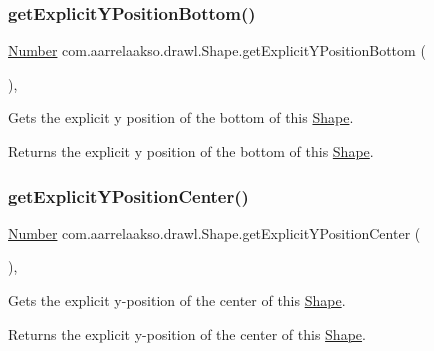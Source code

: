 \subsubsection{\texorpdfstring{get\+Explicit\+Y\+Position\+Bottom()}{getExplicitYPositionBottom()}}
{\footnotesize\ttfamily \hyperlink{interfacecom_1_1aarrelaakso_1_1drawl_1_1_number}{Number} com.\+aarrelaakso.\+drawl.\+Shape.\+get\+Explicit\+Y\+Position\+Bottom (\begin{DoxyParamCaption}{ }\end{DoxyParamCaption})\hspace{0.3cm}{\ttfamily [protected]}, {\ttfamily [inherited]}}



Gets the explicit y position of the bottom of this \hyperlink{classcom_1_1aarrelaakso_1_1drawl_1_1_shape}{Shape}. 

\begin{DoxyReturn}{Returns}
the explicit y position of the bottom of this \hyperlink{classcom_1_1aarrelaakso_1_1drawl_1_1_shape}{Shape}. 
\end{DoxyReturn}
\mbox{\label{classcom_1_1aarrelaakso_1_1drawl_1_1_shape_a1e46cc626d5f5e1360d9d35d23cc50ea}} 
\subsubsection{\texorpdfstring{get\+Explicit\+Y\+Position\+Center()}{getExplicitYPositionCenter()}}
{\footnotesize\ttfamily \hyperlink{interfacecom_1_1aarrelaakso_1_1drawl_1_1_number}{Number} com.\+aarrelaakso.\+drawl.\+Shape.\+get\+Explicit\+Y\+Position\+Center (\begin{DoxyParamCaption}{ }\end{DoxyParamCaption})\hspace{0.3cm}{\ttfamily [protected]}, {\ttfamily [inherited]}}



Gets the explicit y-\/position of the center of this \hyperlink{classcom_1_1aarrelaakso_1_1drawl_1_1_shape}{Shape}. 

\begin{DoxyReturn}{Returns}
the explicit y-\/position of the center of this \hyperlink{classcom_1_1aarrelaakso_1_1drawl_1_1_shape}{Shape}. 
\end{DoxyReturn}
\mbox{\label{classcom_1_1aarrelaakso_1_1drawl_1_1_shape_a8c65dff2026744ae10648de3908165e5}} 
